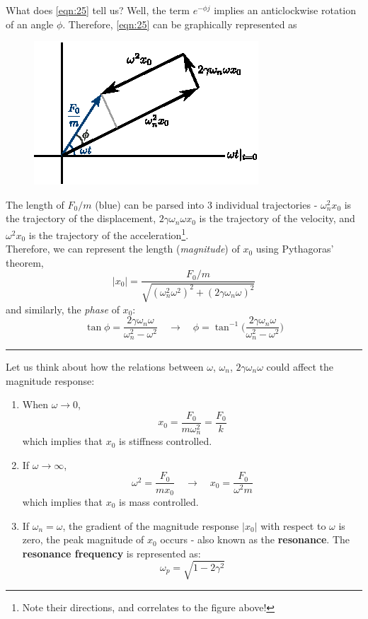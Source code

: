 \documentclass[12pt,a4paper]{article}
\begin{document}
\begin{tcolorbox}[breakable, title=Solution Procedure and Discussions]
What does \autoref{eqn:25} tell us? Well, the term $e^{-\phi j}$ implies an anticlockwise rotation of an angle $\phi$. Therefore, \autoref{eqn:25} can be graphically represented as
\begin{figure}[H]
    \centering
    \includegraphics[width=.55\textwidth]{rotation_geo.eps}
\end{figure}
The length of $F_0/m$ (blue) can be parsed into 3 individual trajectories - $\omega_{n}^2 x_0$ is the trajectory of the displacement, $2\gamma\omega_{n}\omega x_0$ is the trajectory of the velocity, and $\omega^2 x_0$ is the trajectory of the acceleration\footnote{Note their directions, and correlates to the figure above!}. \\

Therefore, we can represent the length (\textit{magnitude}) of $x_0$ using Pythagoras' theorem,
\begin{equation}
    \lvert x_{0} \rvert = \frac{F_{0}/m}{\sqrt{(\omega_{n}^{2} \omega^{2})^{2}+(2\gamma\omega_{n}\omega)^{2}}}
\end{equation}
and similarly, the \textit{phase} of $x_0$:
\begin{equation}
    \tan \phi = \frac{2\gamma \omega_{n}\omega}{\omega_{n}^{2}-\omega^{2}} \quad \to \quad \phi = \tan^{-1} \bigg(\frac{2\gamma \omega_{n}\omega}{\omega_{n}^{2}-\omega^{2}}\bigg)
\end{equation}

\hrule \vspace{.5cm}

Let us think about how the relations between $\omega$, $\omega_{n}$, $2\gamma\omega_{n}\omega$ could affect the magnitude response:
\begin{enumerate}
	\item When $\omega\to 0$, 
    \[
        x_{0} = \frac{F_{0}}{m\omega_{n}^{2}}=\frac{F_{0}}{k}
    \] 
    which implies that $x_{0}$ is stiffness controlled.
 
	\item If $\omega\to\infty$, 
    \[
        \omega^{2}=\frac{F_{0}}{mx_{0}} \quad \to \quad x_{0}=\frac{F_{0}}{\omega^{2}m}
    \] 
    which implies that $x_{0}$ is mass controlled.
 
	\item If $\omega_{n}=\omega$, the gradient of the magnitude response $\lvert x_0 \rvert$ with respect to $\omega$ is zero, the peak magnitude of $x_0$ occurs - also known as the \textbf{resonance}. The \textbf{resonance frequency} is represented as: 
    \[
        \omega_{p}=\sqrt{1-2\gamma^{2}}
    \]
\end{enumerate}
\end{tcolorbox}
\end{document}
